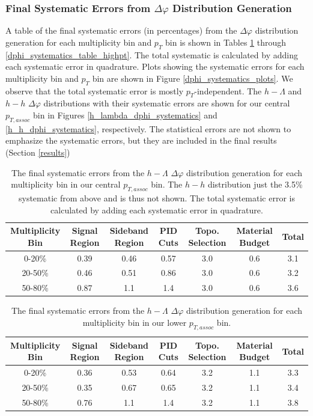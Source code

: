\documentclass[ALICE,manyauthors]{ALICE_analysis_notes}
\begin{document}
\subsubsection{Final Systematic Errors from $\Delta\varphi$ Distribution Generation}
A table of the final systematic errors (in percentages) from the $\Delta\varphi$ distribution generation for each multiplicity bin and $p_{T}$ bin is shown in Tables \ref{dphi_systematics_table} through \ref{dphi_systematics_table_highpt}. The total systematic is calculated by adding each systematic error in quadrature. Plots showing the systematic errors for each multiplicity bin and $p_{T}$ bin are shown in Figure \ref{dphi_systematics_plots}. We observe that the total systematic error is mostly $p_{T}$-independent. The $h-\Lambda$ and $h-h$ $\Delta\varphi$ distributions with their systematic errors are shown for our central $p_{T, assoc}$ bin in Figures \ref{h_lambda_dphi_systematics} and \ref{h_h_dphi_systematics}, respectively. The statistical errors are not shown to emphasize the systematic errors, but they are included in the final results (Section \ref{results})


\begin{table}[ht]
\centering
\begin{tabular}{|c||c|c|c|c|c||c|}
\hline
Multiplicity Bin & Signal Region & Sideband Region & PID Cuts & Topo. Selection & Material Budget & Total \\
\hline
0-20\% & 0.39 & 0.46 & 0.57 & 3.0 & 0.6 & 3.1 \\
20-50\% & 0.46 & 0.51 & 0.86 & 3.0  & 0.6 & 3.2 \\
50-80\% & 0.87 & 1.1 & 1.4 & 3.0  & 0.6 & 3.6 \\
\hline
\end{tabular}
\caption{The final systematic errors from the $h-\Lambda$ $\Delta\varphi$ distribution generation for each multiplicity bin in our central $p_{T, assoc}$ bin. The $h-h$ distribution just the 3.5\% systematic from above and is thus not shown. The total systematic error is calculated by adding each systematic error in quadrature.}
\label{dphi_systematics_table}
\end{table}

\begin{table}[ht]
\centering
\begin{tabular}{|c||c|c|c|c|c||c|}
\hline
Multiplicity Bin & Signal Region & Sideband Region & PID Cuts & Topo. Selection & Material Budget & Total \\
\hline
0-20\% & 0.36 & 0.53 & 0.64 & 3.2 & 1.1 & 3.3 \\
20-50\% & 0.35 & 0.67 & 0.65 & 3.2  & 1.1 & 3.4 \\
50-80\% & 0.76 & 1.1 & 1.4 & 3.2  & 1.1 & 3.8 \\
\hline
\end{tabular}
\caption{The final systematic errors from the $h-\Lambda$ $\Delta\varphi$ distribution generation for each multiplicity bin in our lower $p_{T, assoc}$ bin.}
\label{dphi_systematics_table_lowpt}
\end{table}
\end{document}
